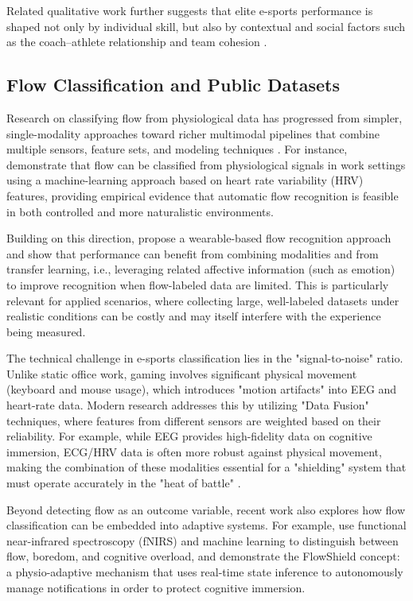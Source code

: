 Related qualitative work further suggests that elite e-sports performance is shaped not only by individual skill, but also by contextual and social factors such as the coach--athlete relationship and team cohesion \autocite{poulus2021determinants}.


\subsection{Flow Classification and Public Datasets}

Research on classifying flow from physiological data has progressed from simpler, single-modality approaches toward richer multimodal pipelines that combine multiple sensors, feature sets, and modeling techniques \autocite{irshad2023wearable}. For instance, \textcite{9296229} demonstrate that flow can be classified from physiological signals in work settings using a machine-learning approach based on heart rate variability (HRV) features, providing empirical evidence that automatic flow recognition is feasible in both controlled and more naturalistic environments.

Building on this direction, \textcite{irshad2023wearable} propose a wearable-based flow recognition approach and show that performance can benefit from combining modalities and from transfer learning, i.e., leveraging related affective information (such as emotion) to improve recognition when flow-labeled data are limited. This is particularly relevant for applied scenarios, where collecting large, well-labeled datasets under realistic conditions can be costly and may itself interfere with the experience being measured.

The technical challenge in e-sports classification lies in the "signal-to-noise" ratio. Unlike static office work, gaming involves significant physical movement (keyboard and mouse usage), which introduces "motion artifacts" into EEG and heart-rate data. Modern research addresses this by utilizing "Data Fusion" techniques, where features from different sensors are weighted based on their reliability. For example, while EEG provides high-fidelity data on cognitive immersion, ECG/HRV data is often more robust against physical movement, making the combination of these modalities essential for a "shielding" system that must operate accurately in the "heat of battle" \autocite{irshad2023wearable, 9296229}.

Beyond detecting flow as an outcome variable, recent work also explores how flow classification can be embedded into adaptive systems. For example, \textcite{ubt_eref88160} use functional near-infrared spectroscopy (fNIRS) and machine learning to distinguish between flow, boredom, and cognitive overload, and demonstrate the FlowShield concept: a physio-adaptive mechanism that uses real-time state inference to autonomously manage notifications in order to protect cognitive immersion.

